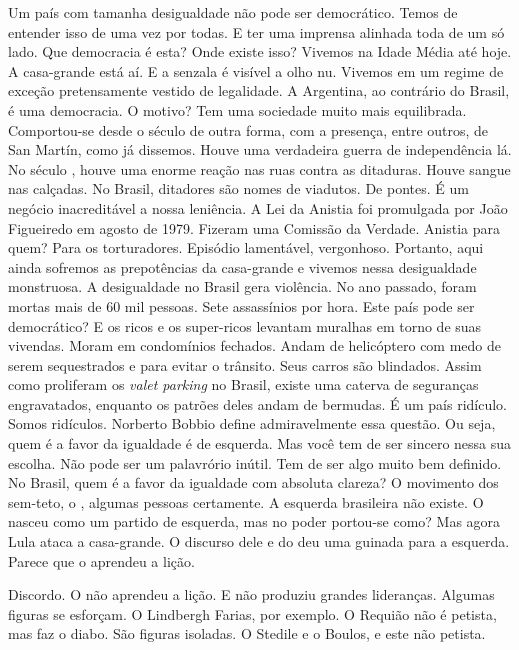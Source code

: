 \normalfont 
Um país com tamanha desigualdade não pode ser
democrático. Temos de entender isso de uma vez por todas. E ter uma
imprensa alinhada toda de um só lado. Que democracia é esta? Onde existe
isso? Vivemos na Idade Média até hoje. A casa-grande está aí. E a
senzala é visível a olho nu. Vivemos em um regime de exceção
pretensamente vestido de legalidade. A Argentina, ao contrário do
Brasil, é uma democracia. O motivo? Tem uma sociedade muito mais
equilibrada. Comportou-se desde o século  de outra forma, com a
presença, entre outros, de San Martín, como já dissemos. Houve uma
verdadeira guerra de independência lá. No século , houve uma enorme
reação nas ruas contra as ditaduras. Houve sangue nas calçadas. No
Brasil, ditadores são nomes de viadutos. De pontes. É um negócio
inacreditável a nossa leniência. A Lei da Anistia foi promulgada por
João Figueiredo em agosto de 1979. Fizeram uma Comissão da Verdade.
Anistia para quem? Para os torturadores. Episódio lamentável,
vergonhoso. Portanto, aqui ainda sofremos as prepotências da casa-grande
e vivemos nessa desigualdade monstruosa. A desigualdade no Brasil gera
violência. No ano passado, foram mortas mais de 60 mil pessoas. Sete
assassínios por hora. Este país pode ser democrático? E os ricos e os
super-ricos levantam muralhas em torno de suas vivendas. Moram em
condomínios fechados. Andam de helicóptero com medo de serem
sequestrados e para evitar o trânsito. Seus carros são blindados. Assim
como proliferam os \emph{valet parking} no Brasil, existe uma caterva de
seguranças engravatados, enquanto os patrões deles andam de bermudas. É
um país ridículo. Somos ridículos. Norberto Bobbio define admiravelmente
essa questão. Ou seja, quem é a favor da igualdade é de esquerda. Mas
você tem de ser sincero nessa sua escolha. Não pode ser um palavrório
inútil. Tem de ser algo muito bem definido. No Brasil, quem é a favor da
igualdade com absoluta clareza? O movimento dos sem-teto, o , algumas
pessoas certamente. A esquerda brasileira não existe. O  nasceu como
um partido de esquerda, mas no poder portou-se como?
%
 Mas agora Lula ataca a casa-grande. O discurso dele e
do  deu uma guinada para a esquerda. Parece que o  aprendeu a lição.

\normalfont 
Discordo. O  não aprendeu a lição. E não produziu
grandes lideranças. Algumas figuras se esforçam. O Lindbergh Farias, por
exemplo. O Requião não é petista, mas faz o diabo. São figuras isoladas.
O Stedile e o Boulos, e este não petista.

